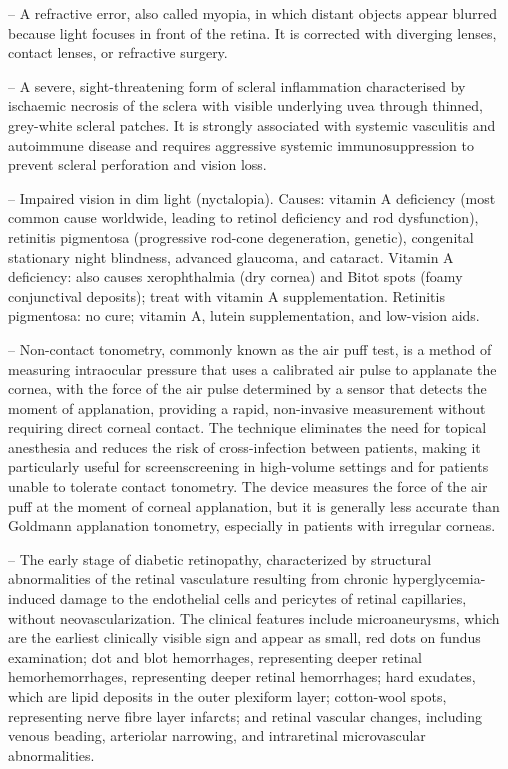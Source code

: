 -- A refractive error, also called myopia, in which distant objects appear blurred because light focuses in front of the retina. It is corrected with diverging lenses, contact lenses, or refractive surgery.

-- A severe, sight-threatening form of scleral inflammation characterised by ischaemic necrosis of the sclera with visible underlying uvea through thinned, grey-white scleral patches. It is strongly associated with systemic vasculitis and autoimmune disease and requires aggressive systemic immunosuppression to prevent scleral perforation and vision loss.

-- Impaired vision in dim light (nyctalopia). Causes: vitamin A deficiency (most common cause worldwide, leading to retinol deficiency and rod dysfunction), retinitis pigmentosa (progressive rod-cone degeneration, genetic), congenital stationary night blindness, advanced glaucoma, and cataract. Vitamin A deficiency: also causes xerophthalmia (dry cornea) and Bitot spots (foamy conjunctival deposits); treat with vitamin A supplementation. Retinitis pigmentosa: no cure; vitamin A, lutein supplementation, and low-vision aids.

-- Non-contact tonometry, commonly known as the air puff test, is a method of measuring intraocular pressure that uses a calibrated air pulse to applanate the cornea, with the force of the air pulse determined by a sensor that detects the moment of applanation, providing a rapid, non-invasive measurement without requiring direct corneal contact. The technique eliminates the need for topical anesthesia and reduces the risk of cross-infection between patients, making it particularly useful for screenscreening in high-volume settings and for patients unable to tolerate contact tonometry. The device measures the force of the air puff at the moment of corneal applanation, but it is generally less accurate than Goldmann applanation tonometry, especially in patients with irregular corneas.

-- The early stage of diabetic retinopathy, characterized by structural abnormalities of the retinal vasculature resulting from chronic hyperglycemia-induced damage to the endothelial cells and pericytes of retinal capillaries, without neovascularization. The clinical features include microaneurysms, which are the earliest clinically visible sign and appear as small, red dots on fundus examination; dot and blot hemorrhages, representing deeper retinal hemorhemorrhages, representing deeper retinal hemorrhages; hard exudates, which are lipid deposits in the outer plexiform layer; cotton-wool spots, representing nerve fibre layer infarcts; and retinal vascular changes, including venous beading, arteriolar narrowing, and intraretinal microvascular abnormalities.

